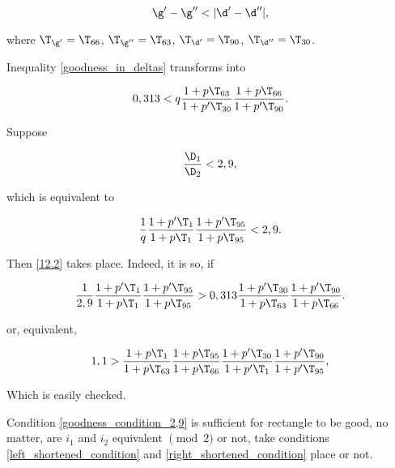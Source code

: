 \begin{equation}\label{goodness_in_deltas} %
	\g' - \g'' < |\d' - \d''|,
\end{equation}

where
$\T_{\g'} = \T_{66}$,
$\T_{\g''} = \T_{63}$,
$\T_{\d'} = \T_{90}$,
$\T_{\d''} = \T_{30}$.


Inequality \ref{goodness_in_deltas} transforms into

\begin{equation}\label{12.2} %
	0,313 <
	q
	\dfrac{1 + p \T_{63}}{1 + p' \T_{30}}
	\dfrac{1 + p \T_{66}}{1 + p' \T_{90}}.
\end{equation}

Suppose

\begin{equation}\label{goodness_condition_2,9} %
	\dfrac{\D_1}{\D_2} < 2,9,
\end{equation}

which is equivalent to

\begin{equation}%
	\dfrac{1}{q}
	\dfrac{1 + p' \T_{1}}{1 + p \T_{1}}
	\dfrac{1 + p' \T_{95}}{1 + p \T_{95}}
	<
	2,9.
\end{equation}

Then \ref{12.2} takes place. Indeed, it is so, if

\begin{equation*}
	\dfrac{1}{2,9}
	\dfrac{1 + p' \T_{1}}{1 + p \T_{1}}
	\dfrac{1 + p' \T_{95}}{1 + p \T_{95}}
	>
	0,313
	\dfrac{1 + p' \T_{30}}{1 + p \T_{63}}
	\dfrac{1 + p' \T_{90}}{1 + p \T_{66}}.
\end{equation*}

or, equivalent,

\begin{equation*}
	1,1
	>
	\dfrac{1 + p \T_{1}}{1 + p \T_{63}}
	\dfrac{1 + p \T_{95}}{1 + p \T_{66}}
	\dfrac{1 + p' \T_{30}}{1 + p' \T_{1}}
	\dfrac{1 + p' \T_{90}}{1 + p' \T_{95}},
\end{equation*}

Which is easily checked. %

Condition \ref{goodness_condition_2,9} is sufficient for rectangle to be good,
no matter, are $i_1$ and $i_2$ equivalent $\pmod 2$ or not, take conditions
\ref{left_shortened_condition} and \ref{right_shortened_condition} place or not.

